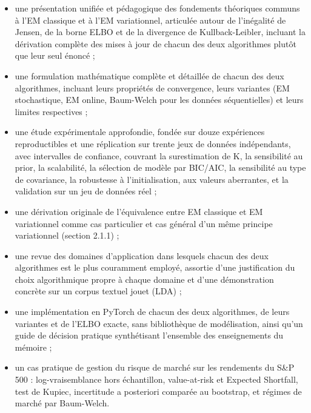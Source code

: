 \begin{itemize}
\item une présentation unifiée et pédagogique des fondements théoriques communs à l'EM classique et à l'EM variationnel, articulée autour de l'inégalité de Jensen, de la borne ELBO et de la divergence de Kullback-Leibler, incluant la dérivation complète des mises à jour de chacun des deux algorithmes plutôt que leur seul énoncé ;
\item une formulation mathématique complète et détaillée de chacun des deux algorithmes, incluant leurs propriétés de convergence, leurs variantes (EM stochastique, EM online, Baum-Welch pour les données séquentielles) et leurs limites respectives ;
\item une étude expérimentale approfondie, fondée sur douze expériences reproductibles et une réplication sur trente jeux de données indépendants, avec intervalles de confiance, couvrant la surestimation de K, la sensibilité au prior, la scalabilité, la sélection de modèle par BIC/AIC, la sensibilité au type de covariance, la robustesse à l'initialisation, aux valeurs aberrantes, et la validation sur un jeu de données réel ;
\item une dérivation originale de l'équivalence entre EM classique et EM variationnel comme cas particulier et cas général d'un même principe variationnel (section 2.1.1) ;
\item une revue des domaines d'application dans lesquels chacun des deux algorithmes est le plus couramment employé, assortie d'une justification du choix algorithmique propre à chaque domaine et d'une démonstration concrète sur un corpus textuel jouet (LDA) ;
\item une implémentation en PyTorch de chacun des deux algorithmes, de leurs variantes et de l'ELBO exacte, sans bibliothèque de modélisation, ainsi qu'un guide de décision pratique synthétisant l'ensemble des enseignements du mémoire ;
\item un cas pratique de gestion du risque de marché sur les rendements du S\&P 500 : log-vraisemblance hors échantillon, value-at-risk et Expected Shortfall, test de Kupiec, incertitude a posteriori comparée au bootstrap, et régimes de marché par Baum-Welch.
\end{itemize}
